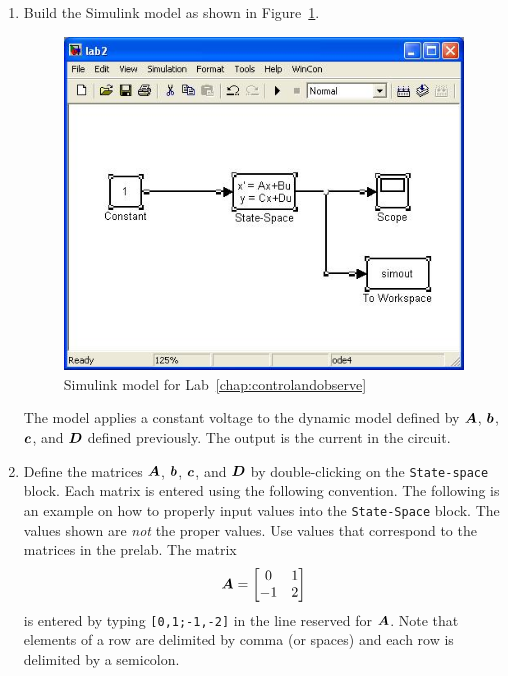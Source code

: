 \begin{enumerate}
\item Build the \textsf{Simulink} model as shown in
Figure~\ref{fig:model2}.
\begin{figure}[htbp]
\centering
\includegraphics[width=0.6\hsize]{pix/controlandobservemodel.jpg}
\caption{\textsf{Simulink} model for Lab~\ref{chap:controlandobserve}}\label{fig:model2}
\end{figure}%
The model applies a constant voltage to the dynamic model defined by
$\boldsymbol{A}$\@, $\boldsymbol{b}$\@, $\boldsymbol{c}$\@, and $\boldsymbol{D}$ defined
previously. The output is the current in the circuit.

\item Define the matrices $\boldsymbol{A}$\@, $\boldsymbol{b}$\@, $\boldsymbol{c}$\@, and
$\boldsymbol{D}$ by double-clicking on the \verb|State-space| block.  Each matrix is
entered using the following convention. The following is an example on how to
properly input values into the \verb|State-Space| block. The values shown are
\emph{not} the proper values.  Use values that correspond to the matrices in
the prelab.  The matrix
\begin{equation*}
\boldsymbol{A}=\begin{bmatrix}0&1\\-1&2\end{bmatrix}
\end{equation*}
is entered by typing \verb|[0,1;-1,-2]| in the line reserved for $\boldsymbol{A}$\@.
Note that elements of a row are delimited by comma (or spaces) and each row
is delimited by a semicolon.


\end{enumerate}
